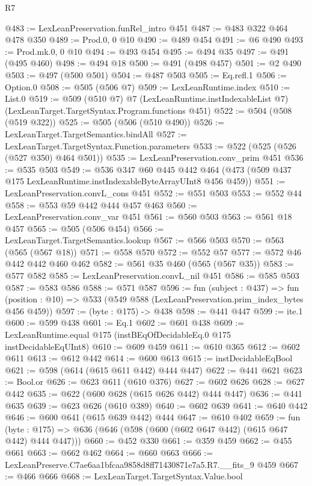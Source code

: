 \begin{lexlean}{R7}
\begin{coremodule}
@483 := LexLeanPreservation.funRel_intro @451
@487 := @483 @322 @464 @478 @350
@489 := Prod.{0, 0} @10
@490 := @489 @454
@491 := @6 @490
@493 := Prod.mk.{0, 0} @10
@494 := @493 @454
@495 := @494 @35
@497 := @491 (@495 @460)
@498 := @494 @18
@500 := @491 (@498 @457)
@501 := @2 @490
@503 := @497 (@500 @501)
@504 := @487 @503
@505 := Eq.refl.{1}
@506 := Option.{0}
@508 := @505 (@506 @7)
@509 := LexLeanRuntime.index
@510 := List.{0}
@519 := @509
    (@510 @7)
    @7
    (LexLeanRuntime.instIndexableList @7)
    (LexLeanTarget.TargetSyntax.Program.functions @451)
@522 := @504 (@508 (@519 @322))
@525 := @505 (@506 (@510 @490))
@526 := LexLeanTarget.TargetSemantics.bindAll
@527 := LexLeanTarget.TargetSyntax.Function.parameters
@533 := @522 (@525 (@526 (@527 @350) @464 @501))
@535 := LexLeanPreservation.conv_prim @451
@536 := @535 @503
@549 := @536
    @347
    @60
    @445
    @442
    @464
    (@473 (@509 @437 @175 LexLeanRuntime.instIndexableByteArrayUInt8 @456 @459))
@551 := LexLeanPreservation.convL_cons @451
@552 := @551 @503
@553 := @552 @44
@558 := @553 @59 @442 @444 @457 @463
@560 := LexLeanPreservation.conv_var @451
@561 := @560 @503
@563 := @561 @18 @457
@565 := @505 (@506 @454)
@566 := LexLeanTarget.TargetSemantics.lookup
@567 := @566 @503
@570 := @563 (@565 (@567 @18))
@571 := @558 @570
@572 := @552 @57
@577 := @572 @46 @442 @442 @460 @462
@582 := @561 @35 @460 (@565 (@567 @35))
@583 := @577 @582
@585 := LexLeanPreservation.convL_nil @451
@586 := @585 @503
@587 := @583 @586
@588 := @571 @587
@596 := fun (subject : @437) =>
  fun (position : @10) => @533 (@549 @588 (LexLeanPreservation.prim_index_bytes @456 @459))
@597 := (byte : @175) -> @438
@598 := @441 @447
@599 := ite.{1}
@600 := @599 @438
@601 := Eq.{1}
@602 := @601 @438
@609 := LexLeanRuntime.equal @175 (instBEqOfDecidableEq.{0} @175 instDecidableEqUInt8)
@610 := @609 @459
@611 := @610 @365
@612 := @602 @611
@613 := @612 @442
@614 := @600 @613
@615 := instDecidableEqBool
@621 := @598 (@614 (@615 @611 @442) @444 @447)
@622 := @441 @621
@623 := Bool.or
@626 := @623 @611 (@610 @376)
@627 := @602 @626
@628 := @627 @442
@635 := @622 (@600 @628 (@615 @626 @442) @444 @447)
@636 := @441 @635
@639 := @623 @626 (@610 @389)
@640 := @602 @639
@641 := @640 @442
@646 := @600 @641 (@615 @639 @442) @444
@647 := @610 @402
@659 := fun (byte : @175) => @636 (@646 (@598 (@600 (@602 @647 @442) (@615 @647 @442) @444 @447)))
@660 := @452 @330
@661 := @359 @459
@662 := @455 @661
@663 := @662 @462
@664 := @660 @663
@666 := LexLeanPreserve.C7ae6aa1bfcaa9858d8ff71430871e7a5.R7.__fits_9 @459
@667 := @466 @666
@668 := LexLeanTarget.TargetSyntax.Value.bool

\end{coremodule}
\end{lexlean}

